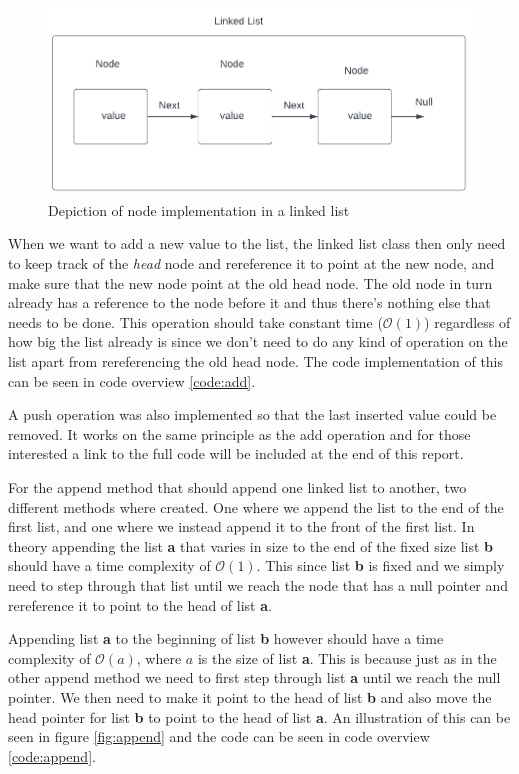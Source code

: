\documentclass[a4paper,11pt]{article}
\begin{document}
\begin{figure}[h]
    \centering
    \includegraphics[width=.8\textwidth]{linkedListDiagram.pdf}
    \caption{Depiction of node implementation in a linked list}
    \label{fig:linkedListDiagram}
\end{figure}
When we want to add a new value to the list, the linked list class then only need to keep track of the \textit{head}
node and rereference it to point at the new node, and make sure that the new node point at the old head node.
The old node in turn already has a reference to the node before it and thus there's nothing else that needs
to be done. This operation should take constant time ($\mathcal{O}(1)$) regardless of how big the list already is since we don't
need to do any kind of operation on the list apart from rereferencing the old head node. The code implementation of this can be seen
in code overview \ref{code:add}.

A push operation was also implemented so that the last inserted value could be removed. It works on the same principle as
the add operation and for those interested a link to the full code will be included at the end of this report.

For the append method that should append one linked list to another, two different methods where created. One where we append
the list to the end of the first list, and one where we instead append it to the front of the first list. In theory appending
the list \textbf{a} that varies in size to the end of the fixed size list \textbf{b} should have a time complexity of
$\mathcal{O}(1)$. This since list \textbf{b} is fixed and we simply need to step through that list until we reach the node
that has a null pointer and rereference it to point to the head of list \textbf{a}.

Appending list \textbf{a} to the beginning of list \textbf{b} however should have a time complexity of $\mathcal{O}(a)$, where $a$
is the size of list \textbf{a}. This is because just as in the other append method we need to first step through list \textbf{a}
until we reach the null pointer. We then need to make it point to the head of list \textbf{b} and also move the head pointer for list
\textbf{b} to point to the head of list \textbf{a}. An illustration of this can be seen in figure \ref{fig:append} and the code
can be seen in code overview \ref{code:append}.
\end{document}
